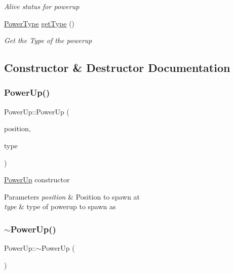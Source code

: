 \begin{DoxyCompactItemize}
\begin{DoxyCompactList}\small\item\em Alive status for powerup \end{DoxyCompactList}\item 
\mbox{\hyperlink{_power_up_8h_a0d0e3226055ad5266e487b58fd01cebd}{Power\+Type}} \mbox{\hyperlink{class_power_up_aa59543dd76b1d7e2bd7caccb9c7e954d}{get\+Type}} ()
\begin{DoxyCompactList}\small\item\em Get the Type of the powerup \end{DoxyCompactList}\end{DoxyCompactItemize}


\subsection{Constructor \& Destructor Documentation}
\mbox{\label{class_power_up_ab2f472d987cbfb8bd72374175ed9b967}} 
\subsubsection{\texorpdfstring{PowerUp()}{PowerUp()}}
{\footnotesize\ttfamily Power\+Up\+::\+Power\+Up (\begin{DoxyParamCaption}\item[{sf\+::\+Vector2f}]{position,  }\item[{\mbox{\hyperlink{_power_up_8h_a0d0e3226055ad5266e487b58fd01cebd}{Power\+Type}}}]{type }\end{DoxyParamCaption})}



\mbox{\hyperlink{class_power_up}{Power\+Up}} constructor 


\begin{DoxyParams}{Parameters}
{\em position} & Position to spawn at\\
\hline
{\em type} & type of powerup to spawn as\\
\hline
\end{DoxyParams}
\mbox{\label{class_power_up_a353053fe27c5a148a2fcd4f5f45e19af}} 
\subsubsection{\texorpdfstring{$\sim$PowerUp()}{~PowerUp()}}
{\footnotesize\ttfamily Power\+Up\+::$\sim$\+Power\+Up (\begin{DoxyParamCaption}{ }\end{DoxyParamCaption})}



